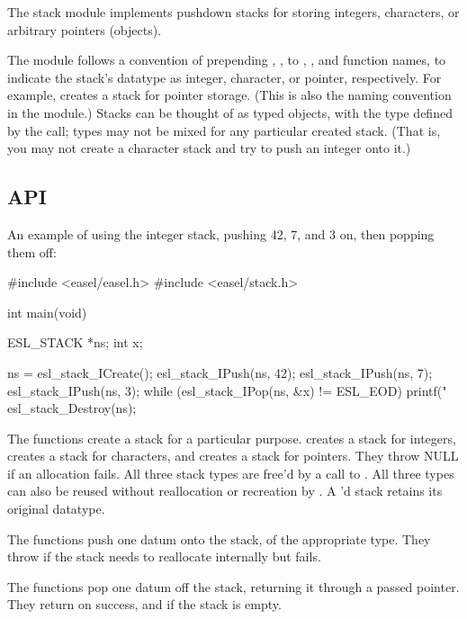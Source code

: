 The stack module implements pushdown stacks for storing integers,
characters, or arbitrary pointers (objects).

The module follows a convention of prepending , ,
 to , , and 
function names, to indicate the stack's datatype as integer,
character, or pointer, respectively. For example,
 creates a stack for pointer
storage. (This is also the naming convention in the 
module.)  Stacks can be thought of as typed objects, with the type
defined by the  call; types may not be mixed for any
particular created stack. (That is, you may not create a character
stack and try to push an integer onto it.)

\subsection{API}
   
An example of using the integer stack, pushing 42, 7, and 3 on, then
popping them off:

\begin{cchunk}
#include <easel/easel.h>
#include <easel/stack.h>

int main(void)
{
   ESL_STACK *ns;
   int        x;

   ns = esl_stack_ICreate();
   esl_stack_IPush(ns, 42);
   esl_stack_IPush(ns, 7);
   esl_stack_IPush(ns, 3);
   while (esl_stack_IPop(ns, &x) != ESL_EOD) 
      printf("%
   esl_stack_Destroy(ns);   
}
\end{cchunk}

The  functions create a stack for a particular
purpose.  creates a stack for integers,
 creates a stack for characters, and
 creates a stack for pointers.  They
throw NULL if an allocation fails.  All three stack types are free'd
by a call to . All three types can also
be reused without reallocation or recreation by
. A 'd stack retains its
original datatype.

The  functions push one datum onto the stack, of the
appropriate type. They throw  if the stack needs to
reallocate internally but fails.

The  functions pop one datum off the stack, returning it
through a passed pointer. They return  on success, and
 if the stack is empty.

